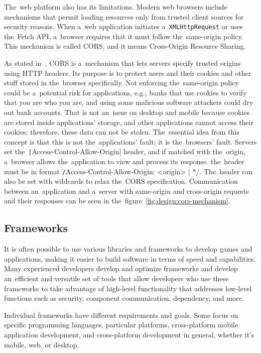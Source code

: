 The~web platform also has its limitations.
Modern web browsers include mechanisms that permit loading resources only from trusted client sources for security reasons.
When a~web application initiates a~\texttt{XMLHttpRequest} or uses the~Fetch API, a~browser requires that it must follow the~same-origin policy.
This mechanism is called CORS, and it means Cross-Origin Resource Sharing.

As stated in~\cite{a2022_crossorigin}, CORS is a~mechanism that lets servers specify trusted origins using HTTP headers.
Its purpose is to protect users and their cookies and other stuff stored in the~browser specifically.
Not enforcing the~same-origin policy could be a~potential risk for applications, e.g., banks that use cookies to verify that you are who you are, and using some malicious software attackers could dry out bank accounts.
That is not an~issue on desktop and mobile because cookies are stored inside applications' storage, and other applications cannot access their cookies; therefore, these data can not be stolen.
The~essential idea from this concept is that this is not the~applications' fault; it is the~browsers' fault.
Servers set the~\texttt|Access-Control-Allow-Origin| header, and if matched with the~origin, a~browser allows the~application to view and process its response. the~header must be in format \texttt/Access-Control-Allow-Origin: <origin> | */.
The~header can also be set with wildcards to relax the~CORS specification.
Communication between an~application and a~server with same-origin and cross-origin requests and their responses can be seen in the~figure~\ref{fig:design:cors-mechanism}.

\subsection{Frameworks}

It is often possible to use various libraries and frameworks to develop games and applications, making it easier to build software in terms of speed and capabilities.
Many experienced developers develop and optimize frameworks and develop an~efficient and versatile set of tools that allow developers who use these frameworks to take advantage of high-level functionality that addresses low-level functions such as security, component communication, dependency, and more.

Individual frameworks have different requirements and goals.
Some focus on specific programming languages, particular platforms, cross-platform mobile application development, and cross-platform development in general, whether it's mobile, web, or desktop.

